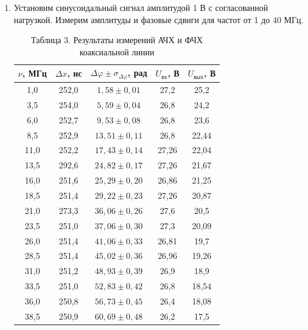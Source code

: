 \documentclass[a4paper]{article}
\begin{document}
\begin{enumerate}
\subsection*{II. Измерение АЧХ и ФЧХ}

    \item Установим синусоидальный сигнал амплитудой 1 В с согласованной нагрузкой. Измерим амплитуды и фазовые сдвиги для частот от 1 до 40 МГц.
\begin{table}[h!]
    \centering
    \begin{tabular}{|c|c|c|c|c|}
        \hline
        $\nu$, МГц & $\Delta x$, нс & $\Delta \varphi \pm \sigma_{\Delta \varphi}$, рад & $U_{\text{вх}}$, В & $U_{\text{вых}}$, В \\ \hline
        1,0 & 252,0 & $1,58 \pm 0,01$ & 27,2 & 25,2 \\ \hline
        3,5 & 254,0 & $5,59 \pm 0,04$ & 26,8 & 24,2 \\ \hline
        6,0 & 252,7 & $9,53 \pm 0,08$ & 26,8 & 23,6 \\ \hline
        8,5 & 252,9 & $13,51 \pm 0,11$ & 26,8 & 22,44 \\ \hline
        11,0 & 252,2 & $17,43 \pm 0,14$ & 27,26 & 22,04 \\ \hline
        13,5 & 292,6 & $24,82 \pm 0,17$ & 27,26 & 21,67 \\ \hline
        16,0 & 251,6 & $25,29 \pm 0,20$ & 26,86 & 21,25 \\ \hline
        18,5 & 251,4 & $29,22 \pm 0,23$ & 27,26 & 20,87 \\ \hline
        21,0 & 273,3 & $36,06 \pm 0,26$ & 27,6 & 20,5 \\ \hline
        23,5 & 251,0 & $37,06 \pm 0,30$ & 27,3 & 20,09 \\ \hline
        26,0 & 251,4 & $41,06 \pm 0,33$ & 26,81 & 19,7 \\ \hline
        28,5 & 251,4 & $45,02 \pm 0,36$ & 26,96 & 19,26 \\ \hline
        31,0 & 251,2 & $48,93 \pm 0,39$ & 26,9 & 18,9 \\ \hline
        33,5 & 251,0 & $52,83 \pm 0,42$ & 26,8 & 18,54 \\ \hline
        36,0 & 250,8 & $56,73 \pm 0,45$ & 26,4 & 18,08 \\ \hline
        38,5 & 250,9 & $60,69 \pm 0,48$ & 26,2 & 17,5 \\ \hline
    \end{tabular}
    \caption{Таблица 3. Результаты измерений АЧХ и ФЧХ коаксиальной линии}
    \label{tab:ach_fch}
\end{table}


\end{enumerate}
\end{document}
